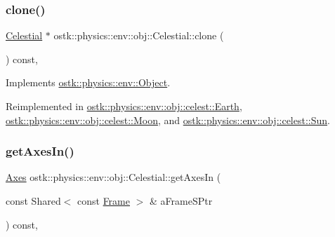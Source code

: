 \subsubsection{\texorpdfstring{clone()}{clone()}}
{\footnotesize\ttfamily \hyperlink{classostk_1_1physics_1_1env_1_1obj_1_1_celestial}{Celestial} $\ast$ ostk\+::physics\+::env\+::obj\+::\+Celestial\+::clone (\begin{DoxyParamCaption}{ }\end{DoxyParamCaption}) const\hspace{0.3cm}{\ttfamily [override]}, {\ttfamily [virtual]}}



Implements \hyperlink{classostk_1_1physics_1_1env_1_1_object_a8e45ece3cf6d7be05a984a8857b7ecd3}{ostk\+::physics\+::env\+::\+Object}.



Reimplemented in \hyperlink{classostk_1_1physics_1_1env_1_1obj_1_1celest_1_1_earth_ae86664b9d6fc870baa1dac5c3219f784}{ostk\+::physics\+::env\+::obj\+::celest\+::\+Earth}, \hyperlink{classostk_1_1physics_1_1env_1_1obj_1_1celest_1_1_moon_adcfeda7b73d32df67f5b38c05ca9351a}{ostk\+::physics\+::env\+::obj\+::celest\+::\+Moon}, and \hyperlink{classostk_1_1physics_1_1env_1_1obj_1_1celest_1_1_sun_a57fd7c3c48115f77e2d3d331ef0e8e0a}{ostk\+::physics\+::env\+::obj\+::celest\+::\+Sun}.

\mbox{\label{classostk_1_1physics_1_1env_1_1obj_1_1_celestial_a52b8cd88b947ca97f94981e5d3e10677}} 
\subsubsection{\texorpdfstring{get\+Axes\+In()}{getAxesIn()}}
{\footnotesize\ttfamily \hyperlink{classostk_1_1physics_1_1coord_1_1_axes}{Axes} ostk\+::physics\+::env\+::obj\+::\+Celestial\+::get\+Axes\+In (\begin{DoxyParamCaption}\item[{const Shared$<$ const \hyperlink{classostk_1_1physics_1_1coord_1_1_frame}{Frame} $>$ \&}]{a\+Frame\+S\+Ptr }\end{DoxyParamCaption}) const\hspace{0.3cm}{\ttfamily [override]}, {\ttfamily [virtual]}}



